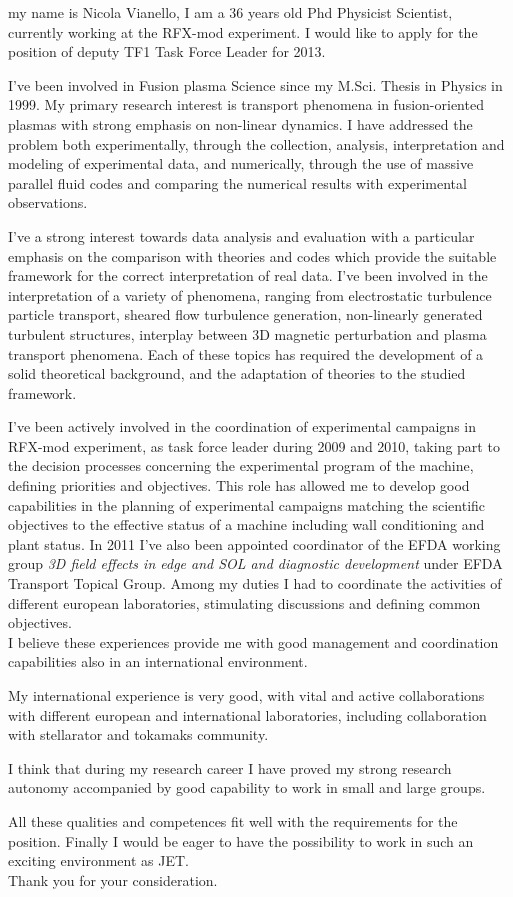 \documentclass[12pt,stdletter,a4paper,dateno,sigleft]{newlfm}
\begin{document}
\begin{newlfm}
my name is Nicola Vianello, I am a 36 years old Phd Physicist Scientist,
currently working at the RFX-mod experiment. I would like to apply for
the position of deputy TF1 Task Force Leader for 2013.

I've been involved in Fusion plasma Science since my M.Sci. Thesis in
Physics in 1999. My primary research interest is transport phenomena in fusion-oriented
plasmas with strong emphasis on non-linear dynamics. I have
addressed the problem both experimentally, through the collection, 
analysis, interpretation and modeling of experimental data, and
numerically, through the use of massive parallel fluid codes and
comparing the numerical results with experimental observations.

I've a strong interest towards 
data analysis and evaluation with a particular emphasis on the
comparison with theories and codes which provide the suitable framework for the
correct interpretation of real data. I've been involved in
the interpretation of a variety of phenomena, ranging from electrostatic
turbulence particle transport, sheared flow turbulence generation,
non-linearly generated turbulent structures, interplay between 3D
magnetic perturbation and plasma transport phenomena. Each of these
topics has required the development of a solid theoretical
background, and the adaptation of theories to the studied framework.

I've been actively involved in the coordination of experimental
campaigns in RFX-mod experiment, as task force leader during 2009 and
2010, taking part to the decision processes concerning the
experimental program of the machine, defining priorities and
objectives. This role has allowed me to develop good capabilities in
the planning of experimental campaigns matching the scientific
objectives to the effective status of a machine including wall
conditioning and plant status.
In 2011 I've also been appointed coordinator of the 
EFDA working group \emph{3D field effects in
  edge and SOL and diagnostic development} under EFDA Transport
Topical Group. Among my duties I had to coordinate the
activities of different  european laboratories, stimulating
discussions and defining common objectives. \\
I believe these experiences
provide me with good management and coordination capabilities also in an
international environment. 

My international experience is very good, with vital and active
collaborations with different european and international laboratories,
including collaboration with stellarator and tokamaks community. 

I think that during my research career I have proved my strong research autonomy
accompanied by good capability to work in small and large groups. 

All these qualities and competences fit well with the
requirements for the position. Finally I would be eager to have the possibility to work in such an exciting environment as JET.\\
Thank you for your consideration. 

\end{newlfm}
\end{document}
